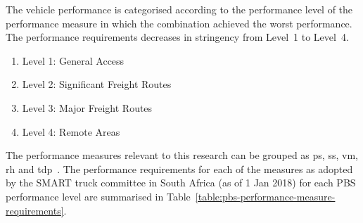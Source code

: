 The vehicle performance is categorised according to the performance level of the performance measure in which the combination achieved the worst performance. The performance requirements decreases in stringency from Level~1 to Level~4.

\begin{enumerate}
  \item Level 1: General Access
  \item Level 2: Significant Freight Routes
  \item Level 3: Major Freight Routes
  \item Level 4: Remote Areas
\end{enumerate}

The performance measures relevant to this research can be grouped as \gls{ps}, \gls{ss}, \gls{vm}, \gls{rh} and \gls{tdp}~\cite{Arredondo2012}. The performance requirements for each of the measures as adopted by the SMART truck committee in South Africa (as of 1 Jan 2018) for each PBS performance level are summarised in Table~\ref{table:pbs-performance-measure-requirements}.

